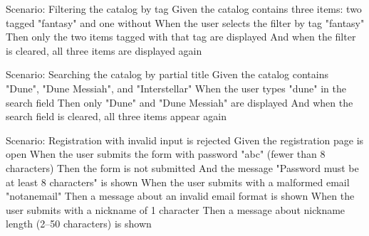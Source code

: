 \begin{codelisting}
\caption{Filtering by Tag}
\label{lst:bdd-tag}
\begin{skedcode}
Scenario: Filtering the catalog by tag
  Given the catalog contains three items: two tagged "fantasy" and one without
  When the user selects the filter by tag "fantasy"
  Then only the two items tagged with that tag are displayed
  And when the filter is cleared, all three items are displayed again
\end{skedcode}
\end{codelisting}

\begin{codelisting}
\caption{Searching by Partial Title}
\label{lst:bdd-search}
\begin{skedcode}
Scenario: Searching the catalog by partial title
  Given the catalog contains "Dune", "Dune Messiah", and "Interstellar"
  When the user types "dune" in the search field
  Then only "Dune" and "Dune Messiah" are displayed
  And when the search field is cleared, all three items appear again
\end{skedcode}
\end{codelisting}

\begin{codelisting}
\caption{Registration Input Validation}
\label{lst:bdd-validation}
\begin{skedcode}
Scenario: Registration with invalid input is rejected
  Given the registration page is open
  When the user submits the form with password "abc" (fewer than 8 characters)
  Then the form is not submitted
  And the message "Password must be at least 8 characters" is shown
  When the user submits with a malformed email "notanemail"
  Then a message about an invalid email format is shown
  When the user submits with a nickname of 1 character
  Then a message about nickname length (2--50 characters) is shown
\end{skedcode}
\end{codelisting}
